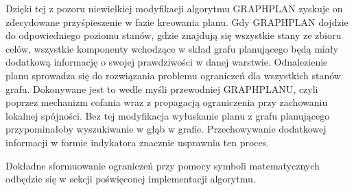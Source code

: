     Dzięki tej z pozoru niewielkiej modyfikacji algorytmu GRAPHPLAN zyskuje on zdecydowane przyśpieszenie w fazie kreowania planu. Gdy GRAPHPLAN dojdzie do odpowiedniego
    poziomu stanów, gdzie znajdują się wszystkie stany ze zbioru celów, wszystkie komponenty wchodzące w skład grafu planującego będą miały dodatkową informację o swojej prawdziwości 
    w danej warstwie. Odnalezienie planu sprowadza się do rozwiązania problemu ograniczeń dla wszystkich stanów grafu. Dokonywane jest to wedle myśli przewodniej GRAPHPLANU, czyli 
    poprzez mechanizm cofania wraz z propagacją ograniczenia przy zachowaniu lokalnej spójności. Bez tej modyfikacja wyłuskanie planu z grafu planującego przypominałoby wyszukiwanie 
    w głąb w grafie. Przechowywanie dodatkowej informacji w formie indykatora znacznie usprawnia ten proces.

    Dokładne sformuowanie ograniczeń przy pomocy symboli matematycznych odbędzie się w sekcji poświęconej implementacji algorytmu.
    

